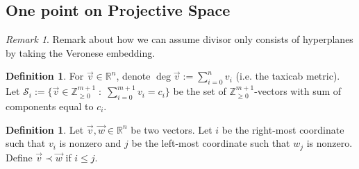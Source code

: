\documentclass{amsart}
\theoremstyle{plain}
\theoremstyle{definition}
\newtheorem{defn}[thm]{Definition}
\theoremstyle{remark}
\newtheorem{rem}[thm]{Remark}
\numberwithin{equation}{section}
\newcommand\ssec{\subsection}
\newcommand\br{{\mathbb R}}
\newcommand\bz{{\mathbb Z}}
\newcommand\mss{\mathscr{S}}
\begin{document}


\ssec{One point on Projective Space}
\label{ssec:proj-one-point}

\begin{rem}
Remark about how we can assume divisor only consists of hyperplanes
by taking the Veronese embedding.
\end{rem}

\begin{defn}
\label{defn:vec-sum}
For $\vec{v} \in \br^n$, denote $\deg \vec{v} := \sum_{i = 0}
^n v_i$ (i.e. the taxicab metric).
Let $\mss_i := \{\vec{v} \in \bz_{\geq 0}^{m + 1} \; : \;
\sum_{i = 0} ^{m + 1} v_i = c_i\}$ be the set of $\bz_{\geq 0}
^{m + 1}$-vectors with sum of components equal to $c_i$.
\end{defn}

\begin{defn}
\label{defn:vec-order}
Let $\vec{v}, \vec{w} \in \br^n$ be two vectors. Let $i$
be the right-most coordinate such that $v_i$ is nonzero
and $j$ be the left-most coordinate such that $w_j$ is
nonzero. Define $\vec{v} \prec \vec{w}$ if $i \leq j$.
\end{defn}
\end{document}
